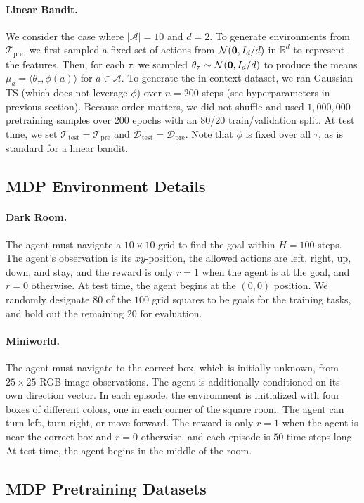 \documentclass{article}
\newcommand{\Acal}{\mathcal{A}}
\newcommand{\Dcal}{\mathcal{D}}
\newcommand{\Ncal}{\mathcal{N}}
\newcommand{\Tcal}{{\mathcal{T}}}
\newcommand{\RR}{\mathbb{R}}
\newcommand*{\zero}{{\bf 0}}
\newcommand{\dotp}[2]{\langle{#1},{#2}\rangle}
\newcommand{\pretraind}{\Dcal_{\text{pre}}}
\newcommand{\pretraint}{\Tcal_{\text{pre}}}
\newcommand{\testt}{\Tcal_{\text{test}}}
\newcommand{\testd}{\Dcal_{\text{test}}}
\begin{document}
\paragraph{Linear Bandit.}
We consider the case where $|\Acal| = 10$ and $d = 2$. To generate environments from $\pretraint$, we first sampled a fixed set of actions from $\Ncal(\zero, I_d / d)$ in $\RR^d$ to represent the features. Then, for each $\tau$, we sampled $\theta_\tau \sim \Ncal(\zero, I_d / d)$ to produce the means $\mu_a = \dotp{\theta_\tau}{\phi(a)}$ for $a \in \Acal$. To generate the in-context dataset, we ran Gaussian TS (which does not leverage $\phi$) over $n = 200$ steps (see hyperparameters in previous section). Because order matters, we did not shuffle and used $1,000,000$ pretraining samples over 200 epochs with an 80/20 train/validation split. At test time, we set $\testt = \pretraint$ and $\testd = \pretraind$. Note that $\phi$ is fixed over all $\tau$, as is standard for a linear bandit.
\subsection{MDP Environment Details}
\label{app:environments}
\paragraph{Dark Room.} The agent must navigate a $10 \times 10$ grid to find the goal within $H = 100$ steps. The agent's observation is its $xy$-position, the allowed actions are left, right, up, down, and stay, and the reward is only $r=1$ when the agent is at the goal, and $r=0$ otherwise. At test time, the agent begins at the $(0, 0)$ position. We randomly designate $80$ of the $100$ grid squares to be goals for the training tasks, and hold out the remaining $20$ for evaluation.
\paragraph{Miniworld.} The agent must navigate to the correct box, which is initially unknown, from $25 \times 25$ RGB image observations. The agent is additionally conditioned on its own direction vector. In each episode, the environment is initialized with four boxes of different colors, one in each corner of the square room. The agent can turn left, turn right, or move forward. The reward is only $r=1$ when the agent is near the correct box and $r=0$ otherwise, and each episode is $50$ time-steps long. At test time, the agent begins in the middle of the room.
\subsection{MDP Pretraining Datasets}
\label{app:pretrain-data}
\end{document}
